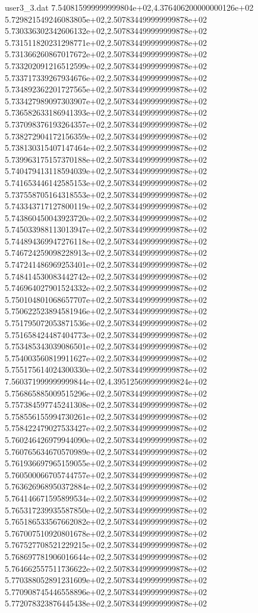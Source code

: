 \begin{filecontents}{user3_3.dat}
7.540815999999999804e+02,4.376406200000000126e+02
5.729821549246083805e+02,2.507834499999999878e+02
5.730336302342606132e+02,2.507834499999999878e+02
5.731511820231298771e+02,2.507834499999999878e+02
5.731366260867017672e+02,2.507834499999999878e+02
5.733202091216512599e+02,2.507834499999999878e+02
5.733717339267934676e+02,2.507834499999999878e+02
5.734892362201727565e+02,2.507834499999999878e+02
5.733427989097303907e+02,2.507834499999999878e+02
5.736582633186941393e+02,2.507834499999999878e+02
5.737098376193264357e+02,2.507834499999999878e+02
5.738272904172156359e+02,2.507834499999999878e+02
5.738130315407147464e+02,2.507834499999999878e+02
5.739963175157370188e+02,2.507834499999999878e+02
5.740479413118594039e+02,2.507834499999999878e+02
5.741653446142585153e+02,2.507834499999999878e+02
5.737558705164318553e+02,2.507834499999999878e+02
5.743343717127800119e+02,2.507834499999999878e+02
5.743860450043923720e+02,2.507834499999999878e+02
5.745033988113013947e+02,2.507834499999999878e+02
5.744894369947276118e+02,2.507834499999999878e+02
5.746724259098228913e+02,2.507834499999999878e+02
5.747241486969253401e+02,2.507834499999999878e+02
5.748414530083442742e+02,2.507834499999999878e+02
5.746964027901524332e+02,2.507834499999999878e+02
5.750104801068657707e+02,2.507834499999999878e+02
5.750622523894581946e+02,2.507834499999999878e+02
5.751795072053871536e+02,2.507834499999999878e+02
5.751658424487404773e+02,2.507834499999999878e+02
5.753485343039086501e+02,2.507834499999999878e+02
5.754003560819911627e+02,2.507834499999999878e+02
5.755175614024300330e+02,2.507834499999999878e+02
7.560371999999999844e+02,4.395125699999999824e+02
5.756865885009515296e+02,2.507834499999999878e+02
5.757384597745241308e+02,2.507834499999999878e+02
5.758556155994730261e+02,2.507834499999999878e+02
5.758422479027533427e+02,2.507834499999999878e+02
5.760246426979944090e+02,2.507834499999999878e+02
5.760765634670570989e+02,2.507834499999999878e+02
5.761936697965159055e+02,2.507834499999999878e+02
5.760500066705744757e+02,2.507834499999999878e+02
5.763626968950372884e+02,2.507834499999999878e+02
5.764146671595899534e+02,2.507834499999999878e+02
5.765317239935587850e+02,2.507834499999999878e+02
5.765186533567662082e+02,2.507834499999999878e+02
5.767007510920801678e+02,2.507834499999999878e+02
5.767527708521229215e+02,2.507834499999999878e+02
5.768697781906016644e+02,2.507834499999999878e+02
5.764662557511736622e+02,2.507834499999999878e+02
5.770388052891231609e+02,2.507834499999999878e+02
5.770908745446558896e+02,2.507834499999999878e+02
5.772078323876445438e+02,2.507834499999999878e+02

\end{filecontents}

